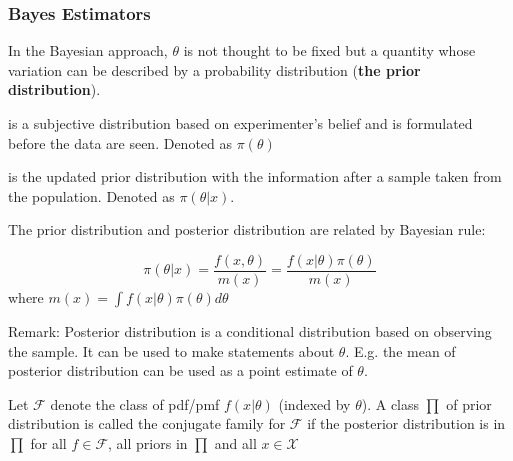 \documentclass[12pt]{article}
\begin{document}
\subsubsection{Bayes Estimators}
In the Bayesian approach, $\theta$ is not thought to be fixed but a quantity whose variation can be described by a probability distribution (\textbf{the prior distribution}).

\begin{definition}
	is a subjective distribution based on experimenter's belief and is formulated before the data are seen. Denoted as $\pi(\theta)$
\end{definition}

\begin{definition} is the updated prior distribution with the information after a sample taken from the population. Denoted as $\pi(\theta | x)$.
\end{definition}

The prior distribution and posterior distribution are related by Bayesian rule:

$$
  \pi(\theta|x) = \frac{f(x, \theta)}{m(x)} =  \frac{f(x|\theta) \pi(\theta)} {m(x)} 
$$
where $m(x) = \int f(x|\theta)\pi(\theta) d\theta$

Remark: Posterior distribution is a conditional distribution based on observing the sample. It can be used to make statements about $\theta$. E.g. the mean of posterior distribution can be used as a point estimate of $\theta$.

\begin{definition}
	Let $\mathcal{F}$ denote the class of pdf/pmf $f(x|\theta)$ (indexed by $\theta$). A class $\prod$ of prior distribution is called the conjugate family for $\mathcal{F}$ if the posterior distribution is in $\prod$ for all $f \in \mathcal{F}$, all priors in $\prod$ and all $x \in \mathcal{X}$
\end{definition}
\end{document}
